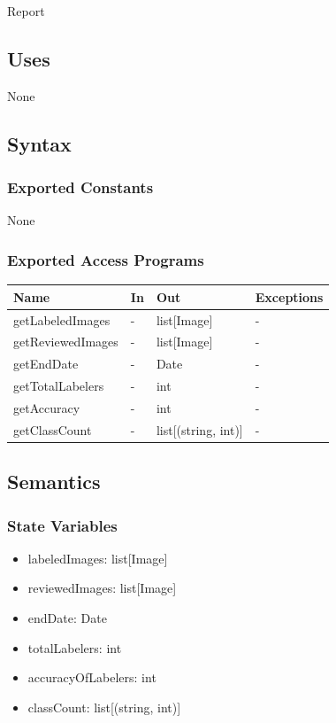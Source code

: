 \documentclass[12pt, titlepage]{article}
\begin{document}
Report

\subsection{Uses}
None

\subsection{Syntax}

\subsubsection{Exported Constants}
None
\subsubsection{Exported Access Programs}

\begin{center}
\begin{tabular}{p{3.2cm} p{4cm} p{4cm} p{2cm}}
\hline
\textbf{Name} & \textbf{In} & \textbf{Out} & \textbf{Exceptions} \\
\hline
getLabeledImages & - & list[Image] & - \\
getReviewedImages & - & list[Image] & - \\
getEndDate & - & Date & - \\
getTotalLabelers & - & int & - \\
getAccuracy & - & int & - \\
getClassCount & - & list[(string, int)] & - \\
\hline
\end{tabular}
\end{center}

\subsection{Semantics}

\subsubsection{State Variables}
\begin{itemize}
    \item labeledImages: list[Image]
    \item reviewedImages: list[Image]
    \item endDate: Date
    \item totalLabelers: int
    \item accuracyOfLabelers: int
    \item classCount: list[(string, int)]
\end{itemize}
\end{document}
